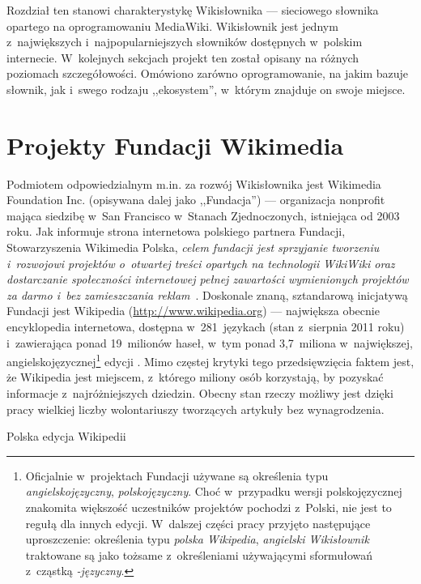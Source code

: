\label{chap:wikt}
Rozdział ten stanowi charakterystykę Wikisłownika --- sieciowego słownika opartego na oprogramowaniu MediaWiki. Wikisłownik jest jednym z~największych i~najpopularniejszych słowników dostępnych w~polskim internecie. W~kolejnych sekcjach projekt ten został opisany na różnych poziomach szczegółowości. Omówiono zarówno oprogramowanie, na jakim bazuje słownik, jak i~swego rodzaju ,,ekosystem'', w~którym znajduje on swoje miejsce.

\section{Projekty Fundacji Wikimedia}
Podmiotem odpowiedzialnym m.in. za rozwój Wikisłownika jest Wikimedia Foundation Inc. (opisywana dalej jako ,,Fundacja'') --- organizacja non\dywiz{}profit mająca siedzibę w~San Francisco w~Stanach Zjednoczonych, istniejąca od 2003 roku. Jak informuje strona internetowa polskiego partnera Fundacji, Stowarzyszenia Wikimedia Polska, \emph{celem fundacji jest sprzyjanie tworzeniu i~rozwojowi projektów o~otwartej treści opartych na technologii WikiWiki oraz dostarczanie społeczności internetowej pełnej zawartości wymienionych projektów za darmo i~bez zamieszczania reklam}~\cite{wm:pl}. Doskonale znaną, sztandarową inicjatywą Fundacji jest Wikipedia (\url{http://www.wikipedia.org}) --- największa obecnie encyklopedia internetowa, dostępna w~281~językach (stan z~sierpnia 2011 roku) i~zawierająca ponad 19~milionów haseł, w~tym ponad 3,7~miliona w~największej, angielskojęzycznej\footnote{Oficjalnie w~projektach Fundacji używane są określenia typu \emph{angielskojęzyczny}, \emph{polskojęzyczny}. Choć w~przypadku wersji polskojęzycznej znakomita większość uczestników projektów pochodzi z~Polski, nie jest to regułą dla innych edycji. W~dalszej części pracy przyjęto następujące uproszczenie: określenia typu \emph{polska Wikipedia}, \emph{angielski Wikisłownik} traktowane są jako tożsame z~określeniami używającymi sformułowań z~cząstką \emph{-języczny}.} edycji \cite{wiki:list}. Mimo częstej krytyki tego przedsięwzięcia faktem jest, że Wikipedia jest miejscem, z~którego miliony osób korzystają, by pozyskać informacje z~najróżniejszych dziedzin. Obecny stan rzeczy możliwy jest dzięki pracy wielkiej liczby wolontariuszy tworzących artykuły bez wynagrodzenia.

\begin{illustration}
	\caption{Polska edycja Wikipedii}
\end{illustration}

